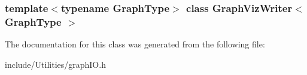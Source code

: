 \subsubsection*{template$<$typename GraphType$>$ class GraphVizWriter$<$ GraphType $>$}



The documentation for this class was generated from the following file:\begin{DoxyCompactItemize}
\item 
include/Utilities/graphIO.h\end{DoxyCompactItemize}

